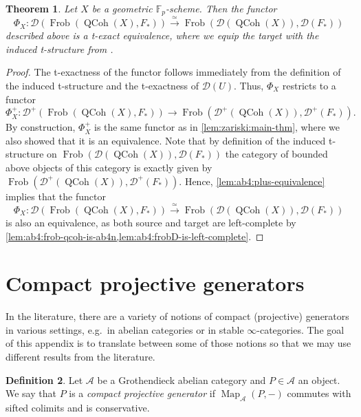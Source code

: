 \documentclass{article}
\theoremstyle{definition}
\newtheorem{defn}{Definition}[section]
\theoremstyle{definition}
\theoremstyle{definition}
\theoremstyle{plain}
\theoremstyle{plain}
\theoremstyle{plain}
\theoremstyle{plain}
\newtheorem{thm}[defn]{Theorem}
\theoremstyle{plain}
\theoremstyle{plain}
\theoremstyle{plain}
\theoremstyle{plain}
\theoremstyle{remark}
\theoremstyle{remark}
\theoremstyle{plain}
\theoremstyle{plain}
\theoremstyle{plain}
\theoremstyle{plain}
\theoremstyle{plain}
\newcommand{\Fp}{\mathbb{F}_p}
\newcommand{\QCoh}[1]{\operatorname{QCoh}(#1)}
\newcommand{\Frob}[2]{\operatorname{Frob}(#1, #2)}
\newcommand{\Cat}[1]{\mathcal{#1}}
\newcommand{\Map}[3]{\operatorname{Map}_{#1}({#2}, {#3})} %
\begin{document}
\begin{thm} \label{lem:ab4:main-thm}
    Let $X$ be a geometric $\Fp$-scheme. Then the functor
    \begin{equation*}
        \Phi_X \colon \Cat{D} (\Frob{\QCoh{X}}{F_*}) \xrightarrow{\simeq} \Frob{\Cat{D}(\QCoh{X})}{\Cat{D}(F_*)}
    \end{equation*}
    described above is a t-exact equivalence,
    where we equip the target with the induced t-structure from \cite[Proposition 3.3]{cartmod}.
\end{thm}
\begin{proof}
    The t-exactness of the functor follows immediately from the definition of the induced t-structure and the t-exactness of $\Cat D(U)$.
    Thus, $\Phi_X$ restricts to a functor
    \begin{equation*}
        \Phi_X^+ \colon \Cat{D}^+ (\Frob{\QCoh{X}}{F_*}) \to \Frob{\Cat{D}^+(\QCoh{X})}{\Cat{D}^+(F_*)}.
    \end{equation*}
    By construction, $\Phi_X^+$ is the same functor as in \cref{lem:zariski:main-thm},
    where we also showed that it is an equivalence. 
    Note that by definition of the induced t-structure on $\Frob{\Cat{D}(\QCoh{X})}{\Cat{D}(F_*)}$
    the category of bounded above objects of this category is exactly given by $\Frob{\Cat{D}^+(\QCoh{X})}{\Cat{D}^+(F_*)}$.
    Hence, \cref{lem:ab4:plus-equivalence} implies that the functor
    \begin{equation*}
        \Phi_X \colon \Cat{D} (\Frob{\QCoh{X}}{F_*}) \xrightarrow{\simeq} \Frob{\Cat{D}(\QCoh{X})}{\Cat{D}(F_*)}
    \end{equation*}
    is also an equivalence, as both source and target are left-complete by \cref{lem:ab4:frob-qcoh-is-ab4n,lem:ab4:frobD-is-left-complete}.
\end{proof}

\appendix
\section{Compact projective generators}
In the literature, there are a variety of notions of compact (projective) generators 
in various settings, e.g.\ in abelian categories or in stable $\infty$-categories.
The goal of this appendix is to translate between some of those notions 
so that we may use different results from the literature.

\begin{defn} \label{defn:cpgen:abelian-generator}
    Let $\Cat A$ be a Grothendieck abelian category and $P \in \Cat A$ an object.
    We say that $P$ is a \emph{compact projective generator}
    if $\Map{\Cat A}{P}{-}$ commutes with sifted colimits and is conservative.
\end{defn}
\end{document}
